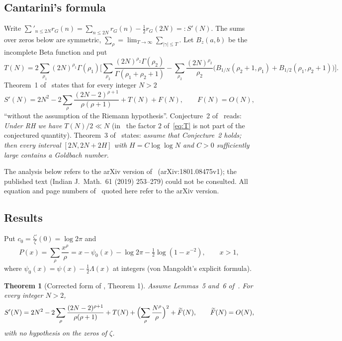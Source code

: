 \documentclass[11pt]{amsart}
\newtheorem{theorem}{Theorem}[section]
\theoremstyle{definition}
\theoremstyle{remark}
\numberwithin{equation}{section}
\newcommand{\rG}{r_G}
\newcommand{\Sp}{S'}
\newcommand{\Ft}{\widetilde F}
\newcommand{\Ca}{\cite{Ca}}
\begin{document}
\subsection{Cantarini's formula}
Write $\sum'_{n\le 2N}\rG(n)=\sum_{n\le 2N}\rG(n)-\frac12\rG(2N)=:\Sp(N)$. The sums over
zeros below are symmetric, $\sum_\rho=\lim_{T\to\infty}\sum_{|\gamma|\le T}$. Let
$B_z(a,b)$ be the incomplete Beta function and put
\begin{equation}\label{eq:T}
  T(N)=2\sum_{\rho_1}(2N)^{\rho_1}\Gamma(\rho_1)\Biggl[\sum_{\rho_2}
  \frac{(2N)^{\rho_2}\Gamma(\rho_2)}{\Gamma(\rho_1+\rho_2+1)}
  -\sum_{\rho_2}\frac{(2N)^{\rho_2}}{\rho_2}
  \bigl(B_{1/N}(\rho_2+1,\rho_1)+B_{1/2}(\rho_1,\rho_2+1)\bigr)\Biggr].
\end{equation}
Theorem~1 of~\Ca{} states that for every integer $N>2$
\begin{equation}\label{eq:CaThm1}
  \Sp(N)=2N^2-2\sum_\rho\frac{(2N-2)^{\rho+1}}{\rho(\rho+1)}+T(N)+F(N),
  \qquad F(N)=O(N),
\end{equation}
``without the assumption of the Riemann hypothesis''. Conjecture~2 of~\Ca{} reads:
\emph{Under RH we have $T(N)/2\ll N$} (in~\Ca{} the factor $2$ of~\eqref{eq:T} is not
part of the conjectured quantity). Theorem~3 of~\Ca{} states: \emph{assume that
Conjecture~2 holds; then every interval $[2N,2N+2H]$ with $H=C\log\log N$ and $C>0$
sufficiently large contains a Goldbach number.}

The analysis below refers to the arXiv version of~\Ca{} (arXiv:1801.08475v1); the
published text (Indian J.\ Math.\ 61 (2019) 253--279) could not be consulted. All equation
and page numbers of~\Ca{} quoted here refer to the arXiv version.

\subsection{Results}
Put $c_0=\frac{\zeta'}{\zeta}(0)=\log 2\pi$ and
\begin{equation}\label{eq:P}
  P(x)=\sum_\rho\frac{x^\rho}{\rho}
  =x-\psi_0(x)-\log 2\pi-\tfrac12\log(1-x^{-2}),\qquad x>1,
\end{equation}
where $\psi_0(x)=\psi(x)-\frac12\Lambda(x)$ at integers (von Mangoldt's explicit formula).

\begin{theorem}[Corrected form of {\Ca{}, Theorem 1}]\label{thm:main}
Assume Lemmas~5 and~6 of~\Ca{}. For every integer $N>2$,
\[
  \Sp(N)=2N^2-2\sum_\rho\frac{(2N-2)^{\rho+1}}{\rho(\rho+1)}+T(N)
  +\Bigl(\sum_\rho\frac{N^\rho}{\rho}\Bigr)^{2}+\Ft(N),\qquad \Ft(N)=O(N),
\]
with no hypothesis on the zeros of $\zeta$.
\end{theorem}
\end{document}
